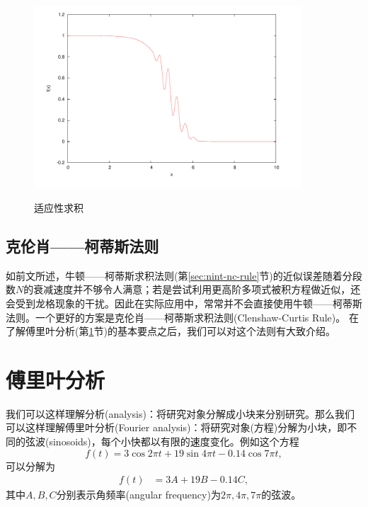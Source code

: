 \begin{figure}[htbp]
   \caption{适应性求积}
  \centering
  \includegraphics[width=10cm]{./Figures/20170227-nc-adaptive-quadrature.png}
  \label{fig:ninc-nc-singularity-adaptive-quadrature}
%
\end{figure}

\subsection{克伦肖——柯蒂斯法则}
\label{sec:ninc-cc-rules}

如前文所述，牛顿——柯蒂斯求积法则(第\ref{sec:nint-nc-rule}节)的近似误差随着分段数$N$的衰减速度并不够令人满意；若是尝试利用更高阶多项式被积方程做近似，还会受到龙格现象的干扰。因此在实际应用中，常常并不会直接使用牛顿——柯蒂斯法则。一个更好的方案是克伦肖——柯蒂斯求积法则(Clenshaw-Curtis Rule)。
在了解傅里叶分析(第\ref{sec:fourier-analysis}节)的基本要点之后，我们可以对这个法则有大致介绍。


\section{傅里叶分析}
\label{sec:fourier-analysis}

我们可以这样理解分析(analysis)：将研究对象分解成小块来分别研究。那么我们可以这样理解傅里叶分析(Fourier analysis)：将研究对象(方程)分解为小块，即不同的弦波(sinosoids)，每个小快都以有限的速度变化。例如这个方程
\begin{equation*}
  f(t) = 3 \cos 2 \pi t + 19 \sin 4\pi t - 0.14 \cos 7 \pi t,
\end{equation*}
可以分解为
\begin{equation*}
  \begin{split}
    f(t) & = 3 A + 19 B - 0.14 C,
  \end{split}
\end{equation*}
其中$A,B,C$分别表示角频率(angular frequency)为$2 \pi, 4 \pi, 7 \pi$的弦波。

